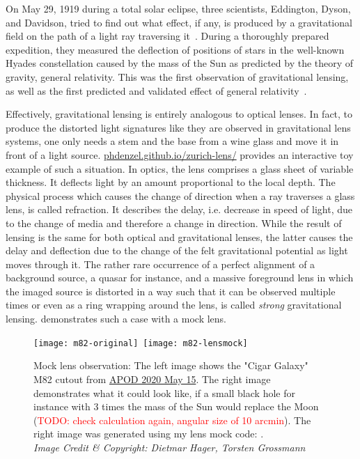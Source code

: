 
On May 29, 1919 during a total solar eclipse, three scientists, Eddington,
Dyson, and Davidson, tried to find out what effect, if any, is produced by a
gravitational field on the path of a light ray traversing
it~\cite{Eddington1920}.  During a thoroughly prepared expedition, they measured
the deflection of positions of stars in the well-known Hyades constellation
caused by the mass of the Sun as predicted by the theory of gravity, general
relativity.  This was the first observation of gravitational lensing, as well as
the first predicted and validated effect of general
relativity~\cite{Einstein1911}.

Effectively, gravitational lensing is entirely analogous to optical lenses. In
fact, to produce the distorted light signatures like they are observed in
gravitational lens systems, one only needs a stem and the base from a wine glass
and move it in front of a light source.
\href{https://phdenzel.github.io/zurich-lens/}{phdenzel.github.io/zurich-lens/}
provides an interactive toy example of such a situation.  In optics, the lens
comprises a glass sheet of variable thickness.  It deflects light by an amount
proportional to the local depth.  The physical process which causes the change
of direction when a ray traverses a glass lens, is called refraction.  It
describes the delay, i.e. decrease in speed of light, due to the change of media
and therefore a change in direction.  While the result of lensing is the same
for both optical and gravitational lenses, the latter causes the delay and
deflection due to the change of the felt gravitational potential as light moves
through it.  The rather rare occurrence of a perfect alignment of a background
source, a quasar for instance, and a massive foreground lens in which the imaged
source is distorted in a way such that it can be observed multiple times or even
as a ring wrapping around the lens, is called \textit{strong} gravitational
lensing.   demonstrates such a case with a mock lens.
%
\begin{figure}[h]%
    \centering%
    \texttt{[image: m82-original]}\,%
    \texttt{[image: m82-lensmock]}
    \caption[Mock lens image of M82]{Mock lens observation: The left image shows
      the "Cigar Galaxy" M82 cutout from
      \href{https://apod.nasa.gov/apod/ap200515.html}{APOD 2020 May 15}. The
      right image demonstrates what it could look like, if a small black hole
      for instance with 3 times the mass of the Sun would replace the Moon
      (\textcolor{red}{TODO: check calculation again, angular size of 10
      arcmin}).  The right image was generated using my lens mock code:
       \cite{lensing.js}.\\
      \textit{Image Credit \& Copyright: Dietmar Hager, Torsten
        Grossmann}}%
\end{figure}%
%

